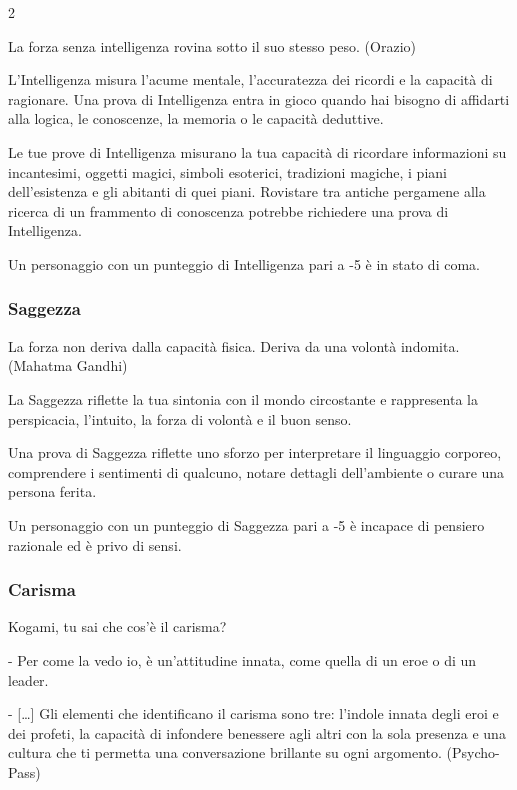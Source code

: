 \begin{multicols}{2}
\begin{enfasi}{
La forza senza intelligenza rovina sotto il suo stesso peso. (Orazio)
}\end{enfasi}

L'Intelligenza misura l'acume mentale, l'accuratezza dei ricordi e la capacità di ragionare.
Una prova di Intelligenza entra in gioco quando hai bisogno di affidarti alla logica, le conoscenze, la memoria o le capacità deduttive.

Le tue prove di Intelligenza misurano la tua capacità di ricordare informazioni su incantesimi, oggetti magici, simboli esoterici, tradizioni magiche, i piani dell'esistenza e gli abitanti di quei piani. Rovistare tra antiche pergamene alla ricerca di un frammento di conoscenza potrebbe richiedere una prova di Intelligenza.

Un personaggio con un punteggio di Intelligenza pari a -5 è in stato di coma.

\subsubsection{Saggezza}\label{saggezza}

\begin{enfasi}{
La forza non deriva dalla capacità fisica. Deriva da una volontà indomita. (Mahatma Gandhi)}\end{enfasi}

La Saggezza riflette la tua sintonia con il mondo circostante e rappresenta la perspicacia, l'intuito, la forza di volontà e il buon senso.

Una prova di Saggezza riflette uno sforzo per interpretare il linguaggio corporeo, comprendere i sentimenti di qualcuno, notare dettagli dell'ambiente o curare una persona ferita.

Un personaggio con un punteggio di Saggezza pari a -5 è incapace di pensiero razionale ed è privo di sensi.

\subsubsection{Carisma}\label{carisma}

\begin{enfasi}{
Kogami, tu sai che cos'è il carisma?

- Per come la vedo io, è un'attitudine innata, come quella di un eroe o di un leader.

- […] Gli elementi che identificano il carisma sono tre: l'indole innata degli eroi e dei profeti, la capacità di infondere benessere agli altri con la sola presenza e una cultura che ti permetta una conversazione brillante su ogni argomento. (Psycho-Pass)
}\end{enfasi}


\end{multicols}
